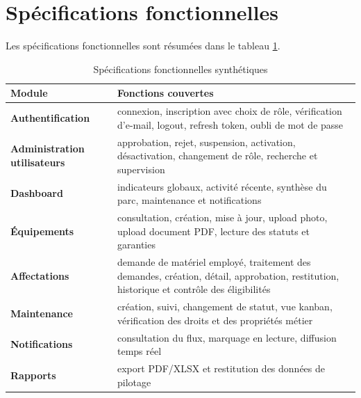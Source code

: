 ﻿\documentclass[12pt,a4paper,oneside]{report}
\begin{document}
\section{Spécifications fonctionnelles}
Les spécifications fonctionnelles sont résumées dans le tableau \ref{tab:specs-fonctionnelles}.

\begin{table}[H]
\centering
\caption{Spécifications fonctionnelles synthétiques}
\label{tab:specs-fonctionnelles}
\begin{tabularx}{\textwidth}{>{\bfseries}p{3cm}X}
\toprule
Module & Fonctions couvertes \\
\midrule
Authentification & connexion, inscription avec choix de rôle, vérification d'e-mail, logout, refresh token, oubli de mot de passe \\
Administration utilisateurs & approbation, rejet, suspension, activation, désactivation, changement de rôle, recherche et supervision \\
Dashboard & indicateurs globaux, activité récente, synthèse du parc, maintenance et notifications \\
Équipements & consultation, création, mise à jour, upload photo, upload document PDF, lecture des statuts et garanties \\
Affectations & demande de matériel employé, traitement des demandes, création, détail, approbation, restitution, historique et contrôle des éligibilités \\
Maintenance & création, suivi, changement de statut, vue kanban, vérification des droits et des propriétés métier \\
Notifications & consultation du flux, marquage en lecture, diffusion temps réel \\
Rapports & export PDF/XLSX et restitution des données de pilotage \\
\bottomrule
\end{tabularx}
\end{table}
\end{document}
